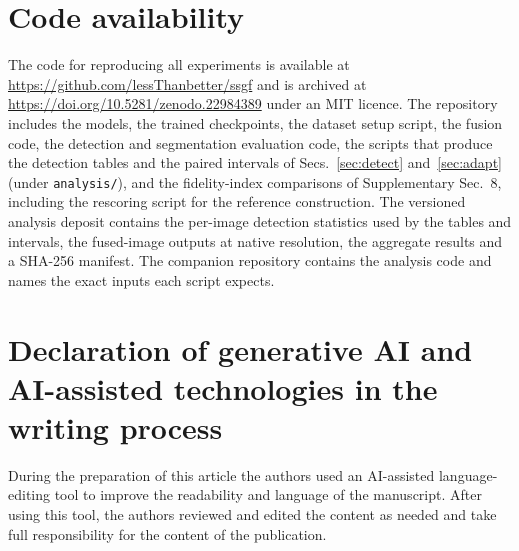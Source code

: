 \documentclass[journal]{IEEEtran}
\begin{document}
\section*{Code availability}
The code for reproducing all experiments is available at
\url{https://github.com/lessThanbetter/ssgf} and is archived at
\url{https://doi.org/10.5281/zenodo.22984389} under an MIT licence. The repository
includes the models,
the trained checkpoints, the dataset setup script, the fusion code, the detection
and segmentation evaluation code, the scripts that produce the detection tables and
the paired intervals of Secs.~\ref{sec:detect} and~\ref{sec:adapt} (under
\texttt{analysis/}), and the fidelity-index comparisons of Supplementary Sec.~8, including
the rescoring script for the reference construction. The versioned analysis deposit
contains the per-image detection statistics used by the tables and intervals, the
fused-image outputs at native resolution, the aggregate results and a SHA-256 manifest.
The companion repository contains the analysis code and names the exact inputs each
script expects.

\section*{Declaration of generative AI and AI-assisted technologies in the writing process}
During the preparation of this article the authors used an AI-assisted language-editing
tool to improve the readability and language of the manuscript. After using this tool,
the authors reviewed and edited the content as needed and take full responsibility for
the content of the publication.

\begingroup
\footnotesize

\endgroup
\end{document}
